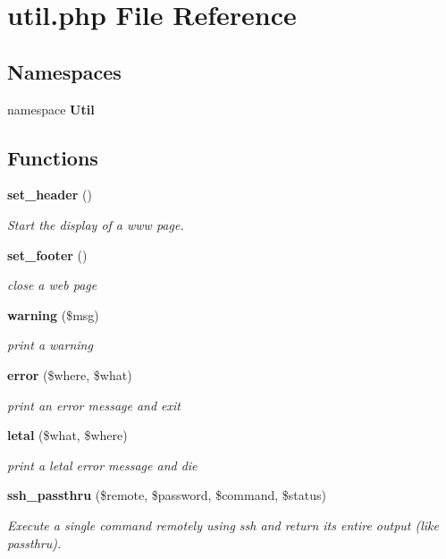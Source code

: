 \section{util.php File Reference}
\label{test_2util_8php}
\subsection*{Namespaces}
\begin{CompactItemize}
\item 
namespace {\bf Util}
\end{CompactItemize}
\subsection*{Functions}
\begin{CompactItemize}
\item 
{\bf set\_\-header} ()
\begin{CompactList}\small\item\em Start the display of a www page. \item\end{CompactList}\item 
{\bf set\_\-footer} ()
\begin{CompactList}\small\item\em close a web page \item\end{CompactList}\item 
{\bf warning} (\$msg)
\begin{CompactList}\small\item\em print a warning \item\end{CompactList}\item 
{\bf error} (\$where, \$what)
\begin{CompactList}\small\item\em print an error message and exit \item\end{CompactList}\item 
{\bf letal} (\$what, \$where)
\begin{CompactList}\small\item\em print a letal error message and die \item\end{CompactList}\item 
{\bf ssh\_\-passthru} (\$remote, \$password, \$command, \$status)
\begin{CompactList}\small\item\em Execute a single command remotely using ssh and return its entire output (like passthru). \item\end{CompactList}\item 

\end{CompactItemize}

